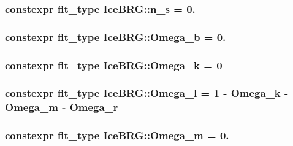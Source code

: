 \hypertarget{namespaceIceBRG_a08eb14835ddd7739204fc116ccfff92d}{
\subsubsection[{n\-\_\-s}]{\setlength{\rightskip}{0pt plus 5cm}constexpr {\bf flt\-\_\-type} Ice\-B\-R\-G\-::n\-\_\-s = 0.}}\label{namespaceIceBRG_a08eb14835ddd7739204fc116ccfff92d}
\hypertarget{namespaceIceBRG_a109232f7a7118dd2b89b92a18df26a79}{
\subsubsection[{Omega\-\_\-b}]{\setlength{\rightskip}{0pt plus 5cm}constexpr {\bf flt\-\_\-type} Ice\-B\-R\-G\-::\-Omega\-\_\-b = 0.}}\label{namespaceIceBRG_a109232f7a7118dd2b89b92a18df26a79}
\hypertarget{namespaceIceBRG_afb35c6ac056f6db5d60d8cb03a7b997a}{
\subsubsection[{Omega\-\_\-k}]{\setlength{\rightskip}{0pt plus 5cm}constexpr {\bf flt\-\_\-type} Ice\-B\-R\-G\-::\-Omega\-\_\-k = 0}}\label{namespaceIceBRG_afb35c6ac056f6db5d60d8cb03a7b997a}
\hypertarget{namespaceIceBRG_adb990b0d239fa166345fc328d173dfec}{
\subsubsection[{Omega\-\_\-l}]{\setlength{\rightskip}{0pt plus 5cm}constexpr {\bf flt\-\_\-type} Ice\-B\-R\-G\-::\-Omega\-\_\-l = 1 -\/ {\bf Omega\-\_\-k} -\/ {\bf Omega\-\_\-m} -\/ {\bf Omega\-\_\-r}}}\label{namespaceIceBRG_adb990b0d239fa166345fc328d173dfec}
\hypertarget{namespaceIceBRG_acddabe6e9443c1f8cb4b3c1093342aa3}{
\subsubsection[{Omega\-\_\-m}]{\setlength{\rightskip}{0pt plus 5cm}constexpr {\bf flt\-\_\-type} Ice\-B\-R\-G\-::\-Omega\-\_\-m = 0.}}\label{namespaceIceBRG_acddabe6e9443c1f8cb4b3c1093342aa3}
